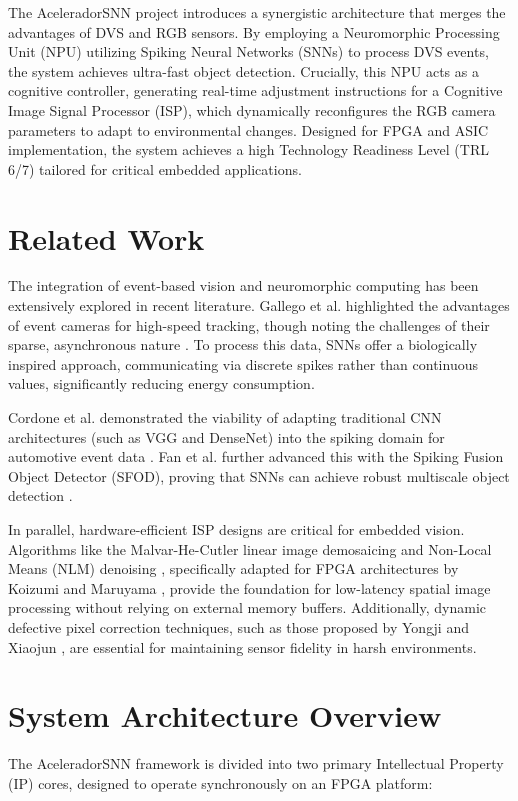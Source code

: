 \documentclass[conference]{IEEEtran}
\begin{document}
The AceleradorSNN project introduces a synergistic architecture that merges the advantages of DVS and RGB sensors. By employing a Neuromorphic Processing Unit (NPU) utilizing Spiking Neural Networks (SNNs) to process DVS events, the system achieves ultra-fast object detection. Crucially, this NPU acts as a cognitive controller, generating real-time adjustment instructions for a Cognitive Image Signal Processor (ISP), which dynamically reconfigures the RGB camera parameters to adapt to environmental changes. Designed for FPGA and ASIC implementation, the system achieves a high Technology Readiness Level (TRL 6/7) tailored for critical embedded applications.

\section{Related Work}
The integration of event-based vision and neuromorphic computing has been extensively explored in recent literature. Gallego et al. highlighted the advantages of event cameras for high-speed tracking, though noting the challenges of their sparse, asynchronous nature \cite{gallego2020}. To process this data, SNNs offer a biologically inspired approach, communicating via discrete spikes rather than continuous values, significantly reducing energy consumption. 

Cordone et al. demonstrated the viability of adapting traditional CNN architectures (such as VGG and DenseNet) into the spiking domain for automotive event data \cite{cordone2022}. Fan et al. further advanced this with the Spiking Fusion Object Detector (SFOD), proving that SNNs can achieve robust multiscale object detection \cite{fan2024}. 

In parallel, hardware-efficient ISP designs are critical for embedded vision. Algorithms like the Malvar-He-Cutler linear image demosaicing \cite{getreuer2011} and Non-Local Means (NLM) denoising \cite{feng2021}, specifically adapted for FPGA architectures by Koizumi and Maruyama \cite{koizumi2020}, provide the foundation for low-latency spatial image processing without relying on external memory buffers. Additionally, dynamic defective pixel correction techniques, such as those proposed by Yongji and Xiaojun \cite{yongji2020}, are essential for maintaining sensor fidelity in harsh environments.

\section{System Architecture Overview}
The AceleradorSNN framework is divided into two primary Intellectual Property (IP) cores, designed to operate synchronously on an FPGA platform:
\end{document}
